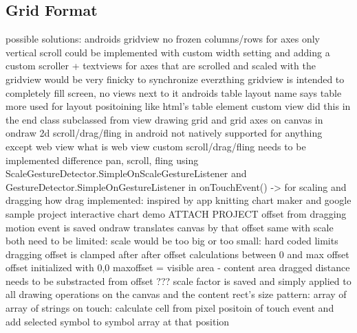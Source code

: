 \subsection{Grid Format}
possible solutions:
	androids gridview
		no frozen columns/rows for axes
		only vertical scroll
		could be implemented with custom width setting and adding a custom scroller
		+ textviews for axes that are scrolled and scaled with the gridview
		would be very finicky to synchronize everzthing
		gridview is intended to completely fill screen, no views next to it
	androids table layout
		name says table
		more used for layout positoining like html's table element
	custom view
		did this in the end
class subclassed from view
drawing grid and grid axes on canvas in ondraw
2d scroll/drag/fling in android not natively supported for anything except web view
what is web view
custom scroll/drag/fling needs to be implemented
difference pan, scroll, fling
using ScaleGestureDetector.SimpleOnScaleGestureListener and GestureDetector.SimpleOnGestureListener in onTouchEvent()
-> for scaling and dragging
how drag implemented:
inspired by app knitting chart maker and google sample project interactive chart demo
	ATTACH PROJECT
	offset from dragging motion event is saved
	ondraw translates canvas by that offset
	same with scale
	both need to be limited: scale would be too big or too small: hard coded limits
	dragging offset is clamped after after offset calculations between 0 and max offset
	offset initialized with 0,0
	maxoffset = visible area - content area
	dragged distance needs to be substracted from offset ???
	scale factor is saved and simply applied to all drawing operations on the canvas and the content rect's size
pattern: array of array of strings
on touch: calculate cell from pixel positoin of touch event and add selected symbol to symbol array at that position

